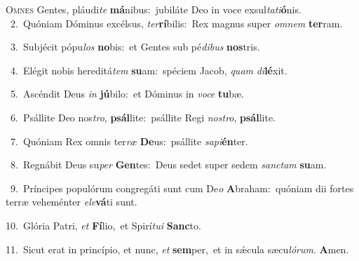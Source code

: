 \lettrine{\initial\textcolor{\initialcolor}{O}}{mnes} Gentes, pláudi\textit{te} \textbf{má}\-nibus:~\star jubiláte Deo in voce exsul\-\textit{ta}\-\textit{ti}\textbf{ó}nis.\\
{\numbfont\textcolor{\numbcolor}{~2.}}~Quóniam Dóminus excélsus, \textit{ter}\-\textbf{rí}bilis:~\star Rex magnus super \textit{om}\-\textit{nem} \textbf{ter}\-ram.\par
{\numbfont\textcolor{\numbcolor}{~3.}}~Subjécit pópu\textit{los} \textbf{no}\-bis:~\star et Gentes sub pé\-\textit{di}\-\textit{bus} \textbf{nos}\-tris.\par
{\numbfont\textcolor{\numbcolor}{~4.}}~Elégit nobis hereditá\textit{tem} \textbf{su}\-am:~\star spéciem Jacob, \textit{quam} \textit{di}\-\textbf{lé}xit.\par
{\numbfont\textcolor{\numbcolor}{~5.}}~Ascéndit Deus \textit{in} \textbf{jú}\-bilo:~\star et Dóminus in \textit{vo}\-\textit{ce} \textbf{tu}\-bæ.\par
{\numbfont\textcolor{\numbcolor}{~6.}}~Psállite Deo nos\-\textit{tro}\-, \textbf{psál}\-lite:~\star psállite Regi \textit{nos}\-\textit{tro}, \textbf{psál}\-lite.\par
{\numbfont\textcolor{\numbcolor}{~7.}}~Quóniam Rex omnis ter\textit{ræ} \textbf{De}\-us:~\star psállite \textit{sa}\-\textit{pi}\textbf{én}ter.\par
{\numbfont\textcolor{\numbcolor}{~8.}}~Regnábit Deus su\textit{per} \textbf{Gen}\-tes:~\star Deus sedet super sedem \textit{sanc}\-\textit{tam} \textbf{su}\-am.\par
{\numbfont\textcolor{\numbcolor}{~9.}}~Príncipes populórum congregáti sunt cum De\textit{o} \textbf{A}\-braham:~\star quóniam dii fortes terræ veheménter \textit{e}\-\textit{le}\textbf{vá}ti sunt.\par
{\numbfont\textcolor{\numbcolor}{10.}}~Glória Patri, \textit{et} \textbf{Fí}\-lio,~\star et Spirí\-\textit{tu}\-\textit{i} \textbf{Sanc}\-to.\par
{\numbfont\textcolor{\numbcolor}{11.}}~Sicut erat in princípio, et nunc, \textit{et} \textbf{sem}\-per,~\star et in sǽcula sæcu\-\textit{ló}\-\textit{rum}. \textbf{A}\-men.\par
